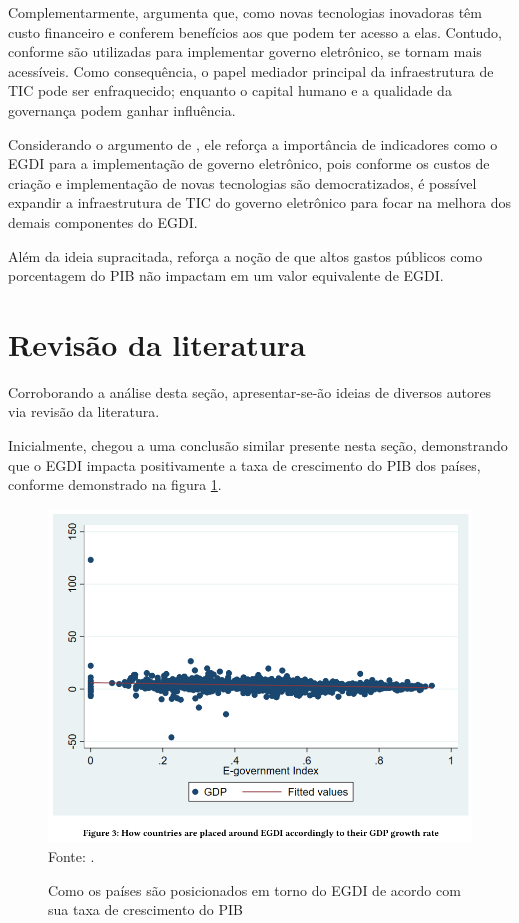 Complementarmente, \cite{singh2007country} argumenta que, como novas tecnologias inovadoras têm custo financeiro e conferem benefícios aos que podem ter acesso a elas. Contudo, conforme são utilizadas para implementar governo eletrônico, se tornam mais acessíveis. Como consequência, o papel mediador principal da infraestrutura de TIC pode ser enfraquecido; enquanto o capital humano e a qualidade da governança podem ganhar influência.

 Considerando o argumento de \cite{singh2007country}, ele reforça a importância de indicadores como o EGDI para a implementação de governo eletrônico, pois conforme os custos de criação e implementação de novas tecnologias são democratizados, é possível expandir a infraestrutura de TIC do governo eletrônico para focar na melhora dos demais componentes do EGDI.

Além da ideia supracitada, \cite{singh2007country} reforça a noção de que altos gastos públicos como porcentagem do PIB não impactam em um valor equivalente de EGDI.

\section{Revisão da literatura}

Corroborando a análise desta seção, apresentar-se-ão ideias de diversos autores via revisão da literatura.

Inicialmente, \cite{alisherovna2021whether} chegou a uma conclusão similar presente nesta seção, demonstrando que o EGDI impacta positivamente a taxa de crescimento do PIB dos países, conforme demonstrado na figura \ref{fig:usmanova_egdi_gdp}.

\begin{figure}[H]
	\centering
	\caption{Como os países são posicionados em torno do EGDI de acordo com sua taxa de crescimento do PIB}
	\includegraphics[width=1\linewidth]{figuras/usmanova_egdi_gdp}
	\label{fig:usmanova_egdi_gdp}
	\footnotesize{Fonte: \cite{alisherovna2021whether}.}
\end{figure}

